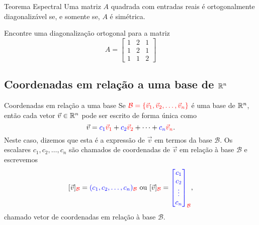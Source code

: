 \begin{frame}[label=orto]{}

\begin{block}{Teorema Espectral}
Uma matriz  $A$ quadrada com entradas reais  é ortogonalmente diagonalizável se, e somente se, $A$ é simétrica.
\end{block}

\begin{exe}
Encontre  uma diagonalização ortogonal para a matriz
\[A=
\begin{bmatrix}
1 & 2 & 1\\ 1& 2 & 1 \\ 1 & 1 & 2
\end{bmatrix}
\]
\end{exe}

\end{frame}



\subsection*{Coordenadas em relação a uma base de $\mathbb{R}^n$}
\begin{frame}[label=lild]{Coordenadas em relação a uma base}
Se ${\color{red}\mathcal{B}=\{\vec{v}_1,\vec{v}_2,\ldots,\vec{v}_n\}}$ é uma base de $\mathbb{R}^n$, então cada vetor $\vec{v}\in \mathbb{R}^n$ pode ser escrito de forma única como
\[\vec{v}={\color{blue}c_1}{\color{red}\vec{v}_1}+{\color{blue}c_2}{\color{red}\vec{v}_2}+\cdots+{\color{blue}c_n}{\color{red}\vec{v}_n}.\]
Neste caso, dizemos que esta é a {\color{blue}expressão de $\vec{v}$ em termos da base $\mathcal{B}$}. Os escalares {\color{blue}$c_1,c_2,\ldots,c_n$} são chamados de {\color{blue}coordenadas} de $\vec{v}$ em relação à base $\mathcal{B}$ e escrevemos 
\[
[\vec{v}]_{{\color{red}\mathcal{B}}}=
{\color{blue}(c_1,c_2,\ldots,c_n)}_{{\color{red}\mathcal{B}}} \text{ ou }
[\vec{v}]_{{\color{red}\mathcal{B}}}=
{\color{blue}
\begin{bmatrix}
c_1 \\ c_2 \\ \vdots \\ c_n
\end{bmatrix}_{{\color{red}\mathcal{B}}}},
\]
chamado {\color{blue}vetor de coordenadas em relação à base $\mathcal{B}$}.

\end{frame}

